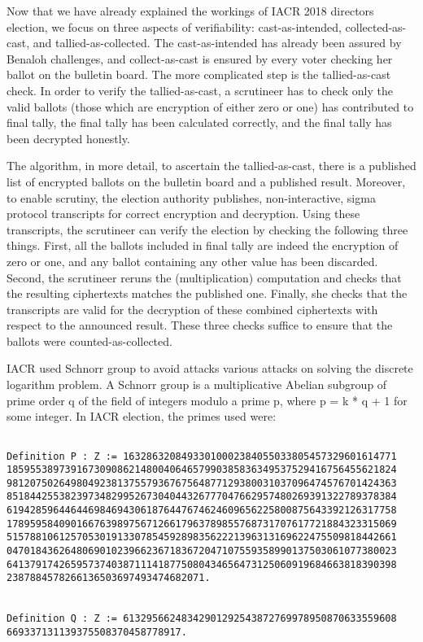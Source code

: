 Now that we have already explained the workings of IACR 2018 directors election,
we focus on 
three aspects of verifiability: cast-as-intended, collected-as-cast, 
and tallied-as-collected.  
The cast-as-intended has already been assured 
by Benaloh challenges, and collect-as-cast is ensured by every voter 
checking her ballot on the bulletin board. 
The more complicated step is the tallied-as-cast
check.  In order to verify the tallied-as-cast, a scrutineer has to check 
only the valid ballots (those which are encryption of either zero or one) 
has contributed to final tally, the final tally has been calculated 
correctly, and the final tally has been decrypted honestly. 

The algorithm, in more detail,  to ascertain the tallied-as-cast, 
there is a published list of encrypted ballots on the bulletin board
and a published result.  Moreover, to enable scrutiny, the election authority publishes, 
non-interactive, sigma protocol transcripts for correct encryption and decryption. 
Using these transcripts,  the scrutineer can verify the election by checking the following
three things. First, all the ballots included in final tally are indeed the encryption of 
zero or one, and any ballot containing any other value has been discarded. 
Second, the scrutineer reruns the (multiplication)
computation and checks that the resulting ciphertexts matches the published one.
Finally, she checks that the transcripts are valid for the decryption of these
combined ciphertexts with respect to the announced result.  These  three checks
suffice to ensure that the ballots were counted-as-collected. 


IACR used Schnorr group \citep{10.1007/0-387-34805-0_22} to avoid attacks various attacks on solving the discrete 
logarithm problem.  A Schnorr group is a multiplicative Abelian subgroup of prime order q of the field of 
integers modulo a prime p, where p = k * q + 1 for some integer.   In IACR election, 
the primes used were:
\begin{verbatim}

Definition P : Z := 16328632084933010002384055033805457329601614771
1859553897391673090862148004064657990385836349537529416756455621824
9812075026498049238137557936767564877129380031037096474576701424363
8518442553823973482995267304044326777047662957480269391322789378384
6194285964464469846943061876447674624609656225800875643392126317758
1789595840901667639897567126617963789855768731707617721884323315069
5157881061257053019133078545928983562221396313169622475509818442661
0470184362648069010239662367183672047107559358990137503061077380023
6413791742659573740387111418775080434656473125060919684663818390398
2387884578266136503697493474682071.


Definition Q : Z := 61329566248342901292543872769978950870633559608
669337131139375508370458778917.


\end{verbatim}

